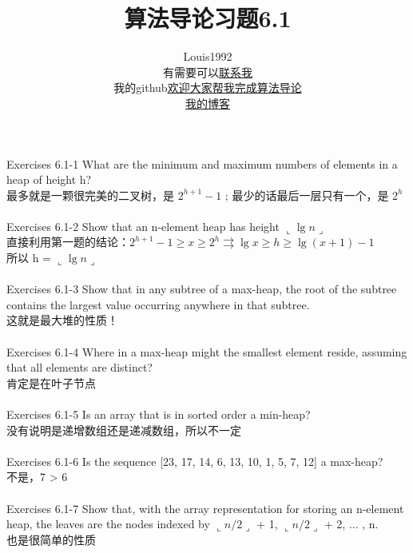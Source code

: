 \documentclass[12pt]{article}
\title{算法导论习题6.1}
\author{Louis1992  \\ 有需要可以\href{mailto:zhenchaogan@hotmail.com}{联系我} 
\\ 我的github\href{https://github.com/gzc}{欢迎大家帮我完成算法导论}   \\ \href{https://gzc.github.io}{我的博客}}
\begin{document}
\maketitle




\noindent Exercises 6.1-1 What are the minimum and maximum numbers of elements in a heap of height h? \\
最多就是一颗很完美的二叉树，是 $2^{h+1}-1$ ;
最少的话最后一层只有一个，是 $2^{h}$ 
\\ 
\\

\noindent Exercises 6.1-2
Show that an n-element heap has height $\llcorner\lg{n}\lrcorner$ \\
直接利用第一题的结论：$2^{h+1}-1\geq x \geq 2^{h} \rightrightarrows  \lg{x} \geq h \geq \lg{(x+1)}-1 $ \\
所以 h = $\llcorner\lg{n}\lrcorner$
\\
\\

\noindent Exercises 6.1-3
Show that in any subtree of a max-heap, the root of the subtree contains the largest value occurring anywhere in that subtree. \\
这就是最大堆的性质！
\\
\\

\noindent Exercises 6.1-4
Where in a max-heap might the smallest element reside, assuming that all elements are distinct? \\
肯定是在叶子节点
\\
\\

\noindent Exercises 6.1-5
Is an array that is in sorted order a min-heap? \\
没有说明是递增数组还是递减数组，所以不一定
\\
\\

\noindent Exercises 6.1-6
Is the sequence [23, 17, 14, 6, 13, 10, 1, 5, 7, 12] a max-heap? \\
不是，7 > 6
\\
\\

\noindent Exercises 6.1-7
Show that, with the array representation for storing an n-element heap, the leaves are the nodes indexed by $\llcorner{n/2}\lrcorner$ + 1, $\llcorner{n/2}\lrcorner$ + 2, ... , n. \\
也是很简单的性质
\end{document}
